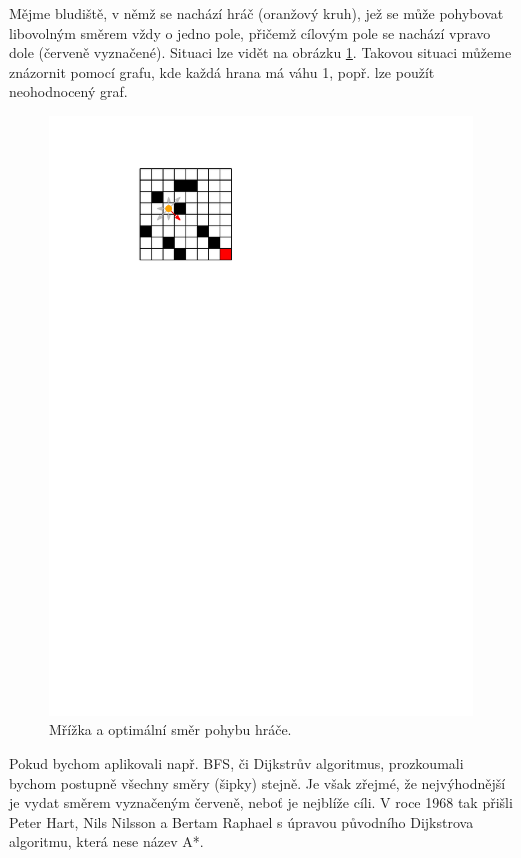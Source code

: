 Mějme bludiště, v němž se nachází hráč (oranžový kruh), jež se může pohybovat libovolným směrem vždy o jedno pole, přičemž cílovým pole se nachází vpravo dole (červeně vyznačené). Situaci lze vidět na obrázku \ref{fig:mrizka}. Takovou situaci můžeme znázornit pomocí grafu, kde každá hrana má váhu 1, popř. lze použít neohodnocený graf.
\begin{figure}[h]
    \centering
    \includegraphics[scale=1.2]{components/images/ch01_mrizka.pdf}
    \caption{Mřížka a optimální směr pohybu hráče.}
    \label{fig:mrizka}
\end{figure}
Pokud bychom aplikovali např. BFS, či Dijkstrův algoritmus, prozkoumali bychom postupně všechny směry (šipky) stejně. Je však zřejmé, že nejvýhodnější je vydat směrem vyznačeným červeně, neboť je nejblíže cíli. V roce 1968 tak přišli Peter Hart, Nils Nilsson a Bertam Raphael s úpravou původního Dijkstrova algoritmu, která nese název A*.

